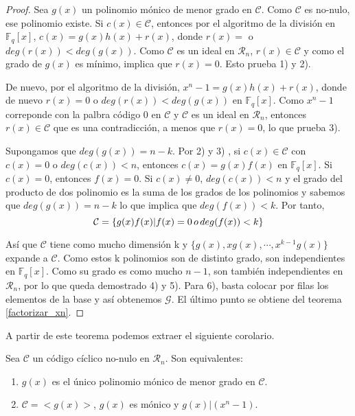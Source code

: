 \begin{proof}
Sea $g(x)$ un polinomio mónico de menor grado en $\mathcal{C}$. Como $\mathcal{C}$ es no-nulo, ese polinomio existe. Si $c(x) \in \mathcal{C}$, entonces por el algoritmo de la división en $\mathbb{F}_q[x]$, $c(x) = g(x)h(x) + r(x)$, donde $r(x) = $ o $deg(r(x)) < deg(g(x))$. Como $\mathcal{C}$ es un ideal en $\mathcal{R}_n$, $r(x) \in \mathcal{C}$ y como el grado de $g(x)$ es mínimo, implica que $r(x) = 0$. Esto prueba 1) y 2).

De nuevo, por el algoritmo de la división, $x^n-1 = g(x)h(x)+r(x)$, donde de nuevo $r(x) = 0$ o $deg(r(x)) < deg(g(x))$ en  $\mathbb{F}_q[x]$. Como $x^n-1$ correponde con la palbra código 0 en $\mathcal{C}$ y $\mathcal{C}$ es un ideal en $\mathcal{R}_n$, entonces $r(x) \in \mathcal{C}$ que es una contradicción, a menos que $r(x) = 0$, lo que prueba 3).

Supongamos que $deg(g(x)) = n-k$. Por 2) y 3) , si $c(x) \in \mathcal{C}$ con $c(x) = 0$ o $deg(c(x)) < n $, entonces $c(x) = g(x)f(x)$ en $\mathbb{F}_q[x]$. Si $c(x) = 0$, entonces $f(x) = 0$. Si $c(x) \neq 0$, $deg(c(x)) < n $ y el grado del producto de dos polinomio es la suma de los grados de los polinomios y sabemos que $deg(g(x)) = n-k$ lo que implica que $deg(f(x)) < k$. Por tanto, 
\[
\mathcal{C} = \{ g(x)f(x) | f(x) = 0 \thinspace o \thinspace deg(f(x)) < k \}
\]

Así que $\mathcal{C}$ tiene como mucho dimensión k y $\{g(x),xg(x),\cdots,x^{k-1}g(x)\}$ expande a $\mathcal{C}$. Como estos k polinomios son de distinto grado, son independientes en $\mathbb{F}_q[x]$. Como su grado es como mucho $n-1$, son también independientes en $\mathcal{R}_n$, por lo que queda demostrado 4) y 5). Para 6), basta colocar por filas los elementos de la base y así obtenemos $\mathcal{G}$. El último punto se obtiene del teorema \ref{factorizar_xn}. 
\end{proof}

A partir de este teorema podemos extraer el siguiente corolario.

\begin{corollary}
\label{co:generador_unico}
Sea $\mathcal{C}$ un código cíclico no-nulo en $\mathcal{R}_n$. Son equivalentes:
\begin{enumerate}
	\item $g(x)$ es el único polinomio mónico de menor grado en $\mathcal{C}$.
	\item $\mathcal{C} = <g(x)>$, $g(x)$ es mónico y $g(x) | (x^n-1)$. 
\end{enumerate}

\end{corollary}

